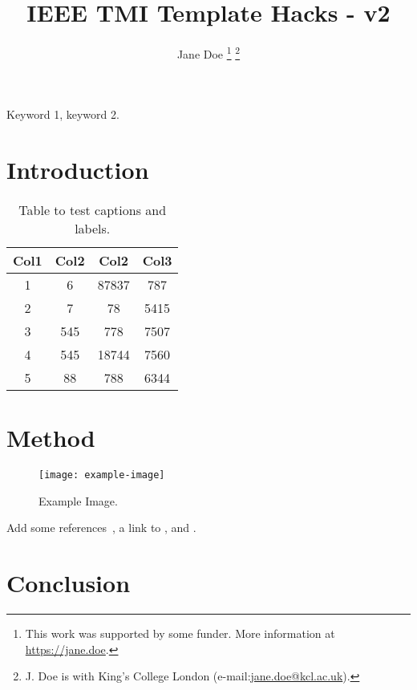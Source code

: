 \documentclass{ieeetmimod}
\begin{document}

\title{IEEE TMI Template Hacks - v2}
\author{Jane Doe
\thanks{This work was supported by some funder. 
More information at \url{https://jane.doe}.}%
\thanks{J. Doe is with King's College London (e-mail:\href{mailto:jane.doe@kcl.ac.uk}{jane.doe@kcl.ac.uk}). }%
}


\maketitle

\begin{abstract}
\blindtext
\end{abstract}

\begin{IEEEkeywords}
Keyword 1, keyword 2.
\end{IEEEkeywords}

\section{Introduction}
\blindtext[2]

\begin{table}[tbh!]
\caption{Table to test captions and labels.\label{tab:example}}
\centering
\begin{tabular}{|c c c c|} 
 \hline
 Col1 & Col2 & Col2 & Col3 \\ [0.5ex] 
 \hline\hline
 1 & 6 & 87837 & 787 \\ 
 2 & 7 & 78 & 5415 \\
 3 & 545 & 778 & 7507 \\
 4 & 545 & 18744 & 7560 \\
 5 & 88 & 788 & 6344 \\ [1ex] 
 \hline
\end{tabular}
\end{table}

\section{Method}
\blindmathpaper

\begin{figure}[tbh!]
\centering
\texttt{[image: example-image]}
\caption{Example Image.\label{fig:example}}
\end{figure}

\blindtext
Add some references~\cite{article-full,inproceedings-full,phdthesis-full,Fidon:PAMI:2024,Bakas:arXiv:2018,Alabi:MedIA:2025}, a link to , and .

\section{Conclusion}
\blindtext[3]



 
\end{document}
